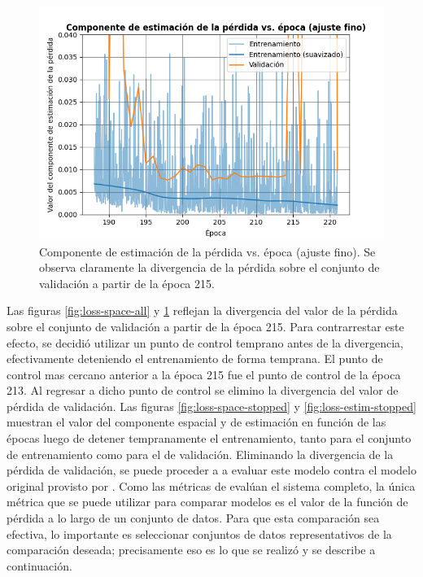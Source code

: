 \begin{figure}[H]
    \centering
    \includegraphics[scale=0.65]{partes/ImgJoao/loss-estim-all.png}
    \caption[Componente de estimación de la pérdida vs. época (ajuste fino).]{Componente de estimación de la pérdida vs. época (ajuste fino). Se observa claramente la divergencia de la pérdida sobre el conjunto de validación a partir de la época 215.}
    \label{fig:loss-estim-all}
\end{figure}

Las figuras \ref{fig:loss-space-all} y \ref{fig:loss-estim-all} reflejan la divergencia del valor de la pérdida sobre el conjunto de validación a partir de la época 215. Para contrarrestar este efecto, se decidió utilizar un punto de control temprano antes de la divergencia, efectivamente deteniendo el entrenamiento de forma temprana. El punto de control mas cercano anterior a la época 215 fue el punto de control de la época 213. Al regresar a dicho punto de control se elimino la divergencia del valor de pérdida de validación. Las figuras \ref{fig:loss-space-stopped} y \ref{fig:loss-estim-stopped} muestran el valor del componente espacial y de estimación en función de las épocas luego de detener tempranamente el entrenamiento, tanto para el conjunto de entrenamiento como para el de validación. Eliminando la divergencia de la pérdida de validación, se puede proceder a a evaluar este modelo contra el modelo original provisto por \cite{Loquercio2021}. Como las métricas de \cite{Loquercio2021} evalúan el sistema completo, la única métrica que se puede utilizar para comparar modelos es el valor de la función de pérdida a lo largo de un conjunto de datos. Para que esta comparación sea efectiva, lo importante es seleccionar conjuntos de datos representativos de la comparación deseada; precisamente eso es lo que se realizó y se describe a continuación.

